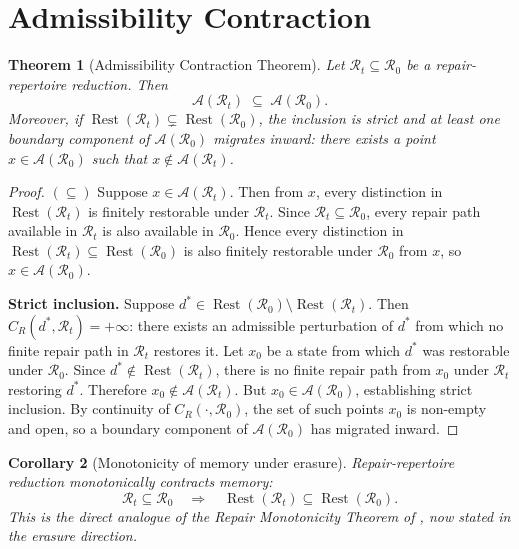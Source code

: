 \documentclass[12pt, oneside]{article}
\theoremstyle{plain}
\newtheorem{theorem}{Theorem}[section]
\newtheorem{corollary}[theorem]{Corollary}
\theoremstyle{definition}
\theoremstyle{remark}
\DeclareMathOperator{\Rest}{Rest}
\newcommand{\CR}{C_{\!R}}
\newcommand{\AO}{\mathcal{A}}
\newcommand{\Rt}{\mathcal{R}_t}
\newcommand{\Rzero}{\mathcal{R}_0}
\newcommand{\Restzt}{\Rest(\Rt)}
\newcommand{\Restzero}{\Rest(\Rzero)}
\begin{document}
\section{Admissibility Contraction}
\label{sec:contraction}

\begin{theorem}[Admissibility Contraction Theorem]
  Let $\Rt \subseteq \Rzero$ be a repair-repertoire reduction.
  Then
  \[
    \AO(\Rt) \;\subseteq\; \AO(\Rzero).
  \]
  Moreover, if $\Restzt \subsetneq \Restzero$, the inclusion is
  strict and at least one boundary component of $\AO(\Rzero)$
  migrates inward: there exists a point $x \in \AO(\Rzero)$ such
  that $x \notin \AO(\Rt)$.
  \label{thm:contraction}
\end{theorem}

\begin{proof}
  $(\subseteq)$\;
  Suppose $x \in \AO(\Rt)$.
  Then from $x$, every distinction in $\Restzt$ is finitely
  restorable under $\Rt$.
  Since $\Rt \subseteq \Rzero$, every repair path available in
  $\Rt$ is also available in $\Rzero$.
  Hence every distinction in $\Restzt \subseteq \Restzero$ is also
  finitely restorable under $\Rzero$ from $x$, so
  $x \in \AO(\Rzero)$.

  \textbf{Strict inclusion.}\;
  Suppose $d^* \in \Restzero \setminus \Restzt$.
  Then $\CR(d^*, \Rt) = +\infty$: there exists an admissible
  perturbation of $d^*$ from which no finite repair path in $\Rt$
  restores it.
  Let $x_0$ be a state from which $d^*$ was restorable under
  $\Rzero$.
  Since $d^* \notin \Restzt$, there is no finite repair path from
  $x_0$ under $\Rt$ restoring $d^*$.
  Therefore $x_0 \notin \AO(\Rt)$.
  But $x_0 \in \AO(\Rzero)$, establishing strict inclusion.
  By continuity of $\CR(\cdot, \Rzero)$, the set of such points
  $x_0$ is non-empty and open, so a boundary component of
  $\AO(\Rzero)$ has migrated inward.
\end{proof}

\begin{corollary}[Monotonicity of memory under erasure]
  Repair-repertoire reduction monotonically contracts memory:
  \[
    \Rt \subseteq \Rzero
    \quad\Longrightarrow\quad
    \Rest(\Rt) \subseteq \Rest(\Rzero).
  \]
  This is the direct analogue of the Repair Monotonicity Theorem
  of \cite{Flyxion2026a}, now stated in the erasure direction.
\end{corollary}
\end{document}
